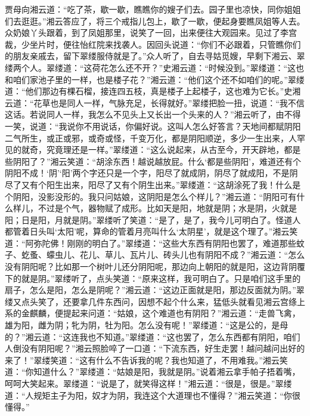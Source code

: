 \documentclass[12pt,oneside]{book}
\begin{document}
贾母向湘云道：“吃了茶，歇一歇，瞧瞧你的嫂子们去。园子里也凉快，同你姐姐们去逛逛。”湘云答应了，将三个戒指儿包上，歇了一歇，便起身要瞧凤姐等人去。众奶娘丫头跟着，到了凤姐那里，说笑了一回，出来便往大观园来。见过了李宫裁，少坐片时，便往怡红院来找袭人。因回头说道：“你们不必跟着，只管瞧你们的朋友亲戚去，留下翠缕服侍就是了。”众人听了，自去寻姑觅嫂，早剩下湘云、翠缕两个人。翠缕道：“这荷花怎么还不开？”史湘云道：“时候没到。”翠缕道：“这也和咱们家池子里的一样，也是楼子花？”湘云道：“他们这个还不如咱们的呢。”翠缕道：“他们那边有棵石榴，接连四五枝，真是楼子上起楼子，这也难为它长。”史湘云道：“花草也是同人一样，气脉充足，长得就好。”翠缕把脸一扭，说道：“我不信这话。若说同人一样，我怎么不见头上又长出一个头来的人？”湘云听了，由不得一笑，说道：“我说你不用说话，你偏好说。这叫人怎么好答言？天地间都赋阴阳二气所生，或正或邪，或奇或怪，千变万化，都是阴阳顺逆，多少一生出来，人罕见的就奇，究竟理还是一样。”翠缕道：“这么说起来，从古至今，开天辟地，都是些阴阳了？”湘云笑道：“胡涂东西！越说越放屁。什么‘都是些阴阳’，难道还有个阴阳不成！‘阴’‘阳’两个字还只是一个字，阳尽了就成阴，阴尽了就成阳，不是阴尽了又有个阳生出来，阳尽了又有个阴生出来。”翠缕道：“这胡涂死了我！什么是个阴阳，没影没形的。我只问姑娘，这阴阳是怎么个样儿？”湘云道：“阴阳可有什么样儿，不过是个气，器物赋了成形。比如天是阳，地就是阴；水是阴，火就是阳；日是阳，月就是阴。”翠缕听了笑道：“是了，是了，我今儿可明白了。怪道人都管着日头叫‘太阳’呢，算命的管着月亮叫什么‘太阴星’，就是这个理了。”湘云笑道：“阿弥陀佛！刚刚的明白了。”翠缕道：“这些大东西有阴阳也罢了，难道那些蚊子、虼蚤、蠓虫儿、花儿、草儿、瓦片儿、砖头儿也有阴阳不成？”湘云道：“怎么没有阴阳呢？比如那一个树叶儿还分阴阳呢，那边向上朝阳的就是阳，这边背阴覆下的就是阴。”翠缕听了，点头笑道：“原来这样，我可明白了。只是咱们这手里的扇子，怎么是阳，怎么是阴呢？”湘云道：“这边正面就是阳，那边反面就为阴。”翠缕又点头笑了，还要拿几件东西问，因想不起个什么来，猛低头就看见湘云宫绦上系的金麒麟，便提起来问道：“姑娘，这个难道也有阴阳？”湘云道：“走兽飞禽，雄为阳，雌为阴；牝为阴，牡为阳。怎么没有呢！”翠缕道：“这是公的，是母的？”湘云道：“这连我也不知道。”翠缕道：“这也罢了，怎么东西都有阴阳，咱们人倒没有阴阳呢？”湘云照脸啐了一口道：“下流东西，好生走罢！越问越问出好的来了！”翠缕笑道：“这有什么不告诉我的呢？我也知道了，不用难我。”湘云笑道：“你知道什么？”翠缕道：“姑娘是阳，我就是阴。”说着湘云拿手帕子捂着嘴，呵呵大笑起来。翠缕道：“说是了，就笑得这样！”湘云道：“很是，很是。”翠缕道：“人规矩主子为阳，奴才为阴，我连这个大道理也不懂得？”湘云笑道：“你很懂得。”
\end{document}
